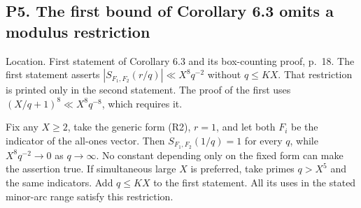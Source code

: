\documentclass[10pt]{article}
\begin{document}
\subsection*{P5. The first bound of Corollary 6.3 omits a modulus restriction}
Location. First statement of Corollary 6.3 and its box-counting proof, p. 18. The first statement asserts \(|S_{F_1,F_2}(r/q)|\ll X^8q^{-2}\) without \(q\le KX\). That restriction is printed only in the second statement. The proof of the first uses \((X/q+1)^8\ll X^8q^{-8}\), which requires it.\par
Fix any \(X\ge2\), take the generic form (R2), \(r=1\), and let both \(F_i\) be the indicator of the all-ones vector. Then \(S_{F_1,F_2}(1/q)=1\) for every \(q\), while \(X^8q^{-2}\to0\) as \(q\to\infty\). No constant depending only on the fixed form can make the assertion true. If simultaneous large \(X\) is preferred, take primes \(q>X^5\) and the same indicators. Add \(q\le KX\) to the first statement. All its uses in the stated minor-arc range satisfy this restriction.\par
\end{document}
